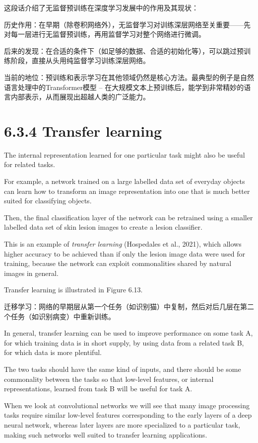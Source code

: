 \documentclass{article}
\begin{document}
{\color{red}
这段话介绍了无监督预训练在深度学习发展中的作用及其现状：

历史作用：在早期（除卷积网络外），无监督学习对训练深层网络至关重要——先对每一层进行无监督预训练，再用监督学习对整个网络进行微调。

后来的发现：在合适的条件下（如足够的数据、合适的初始化等），可以跳过预训练阶段，直接从头用纯监督学习训练深层网络。

当前的地位：预训练和表示学习在其他领域仍然是核心方法。最典型的例子是自然语言处理中的Transformer模型 -- 在大规模文本上预训练后，能学到非常精妙的语言内部表示，从而展现出超越人类的广泛能力。
}

\section{6.3.4 Transfer learning}

The internal representation learned for one particular task might also be useful for related tasks. 

For example, a network trained on a large labelled data set of everyday objects can learn how to transform an image representation into one that is much better suited for classifying objects. 

Then, the final classification layer of the network can be retrained using a smaller labelled data set of skin lesion images to create a lesion classifier. 

This is an example of \emph{transfer learning} (Hospedales et al., 2021), which allows higher accuracy to be achieved than if only the lesion image data were used for training, because the network can exploit commonalities shared by natural images in general. 

Transfer learning is illustrated in Figure 6.13.

{\color{red}
迁移学习：网络的早期层从第一个任务（如识别猫）中复制，然后对后几层在第二个任务（如识别病变）中重新训练。
}

In general, transfer learning can be used to improve performance on some task A, for which training data is in short supply, by using data from a related task B, for which data is more plentiful. 

The two tasks should have the same kind of inputs, and there should be some commonality between the tasks so that low-level features, or internal representations, learned from task B will be useful for task A. 

When we look at convolutional networks we will see that many image processing tasks require similar low-level features corresponding to the early layers of a deep neural network, whereas later layers are more specialized to a particular task, making such networks well suited to transfer learning applications.
\end{document}
